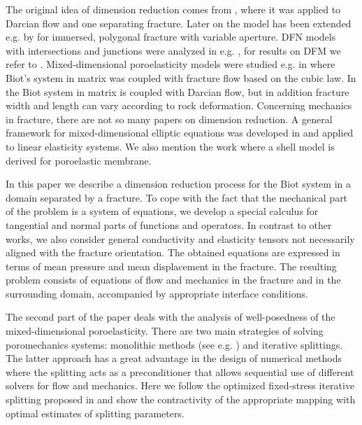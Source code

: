\documentclass[a4paper]{article}
\numberwithin{equation}{section}
\begin{document}
The original idea of dimension reduction comes from \cite{martin_modeling_2005}, where it was applied to Darcian flow and one separating fracture.
Later on the model has been extended e.g. by \cite{angot2009asymptotic} for immersed, polygonal fracture with variable aperture.
DFN models with intersections and junctions were analyzed in e.g. \cite{maryska2005numerical,pichot2012generalized,formaggia2014reduced}, for results on DFM we refer to \cite{schwenck2015dimensionally}.
% 
Mixed-dimensional poroelasticity models were studied e.g. in \cite{ganis2014modeling} where Biot's system in matrix was coupled with fracture flow based on the cubic law.
In \cite{hanowski2018hydromechanical} the Biot system in matrix is coupled with Darcian flow, but in addition fracture width and length can vary according to rock deformation.
Concerning mechanics in fracture, there are not so many papers on dimension reduction.
A general framework for mixed-dimensional elliptic equations was developed in \cite{boon2017functional,boon2019stable} and applied to linear elasticity systems.
We also mention the work \cite{mikelic2019derivation} where a shell model is derived for poroelastic membrane.

In this paper we describe a dimension reduction process for the Biot system in a domain separated by a fracture.
To cope with the fact that the mechanical part of the problem is a system of equations, we develop a special calculus for tangential and normal parts of functions and operators.
In contrast to other works, we also consider general conductivity and elasticity tensors not necessarily aligned with the fracture orientation.
The obtained equations are expressed in terms of mean pressure and mean displacement in the fracture.
The resulting problem consists of equations of flow and mechanics in the fracture and in the surrounding domain, accompanied by appropriate interface conditions.

The second part of the paper deals with the analysis of well-posedness of the mixed-dimensional poroelasticity.
There are two main strategies of solving poromechanics systems: monolithic methods (see e.g. \cite{showalter2000diffusion,zenisek1984existence}) and iterative splittings.
The latter approach has a great advantage in the design of numerical methods where the splitting acts as a preconditioner \cite{white2016block} that allows sequential use of different solvers for flow and mechanics.
Here we follow the optimized fixed-stress iterative splitting proposed in \cite{mikelic2013convergence} and show the contractivity of the appropriate mapping with optimal estimates of splitting parameters.
\end{document}
